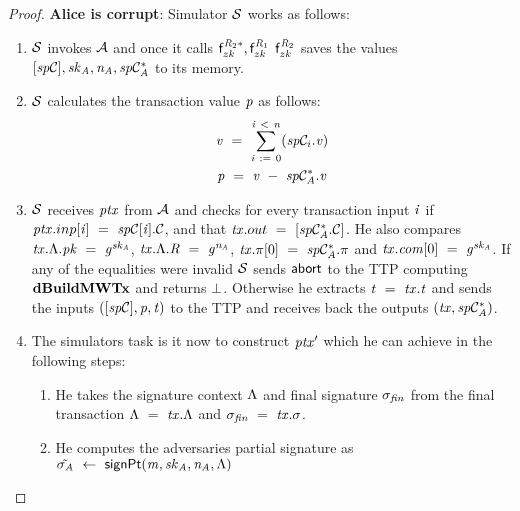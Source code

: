 \begin{proof}
    \textbf{Alice is corrupt}: Simulator $\mathcal{S}$ works as follows:
    \begin{enumerate}
        \item $\mathcal{S}$ invokes $\mathcal{A}$ and once it calls $\mathsf{f}^{\mathit{R}_2*}_{zk}, \mathsf{f}^{\mathit{R}_1}_{zk}$ $\mathsf{f}^{\mathit{R}_2}_{zk}$ saves the values $[\mathit{sp}\mathcal{C}], \mathit{sk}_{\mathit{A}}, \mathit{\mathit{n}_{\mathit{A}}}, \mathit{sp}\mathcal{C}_{\mathit{A}}^*$ to its memory.
        \item $\mathcal{S}$ calculates the transaction value $\mathit{p}$ as follows:
        \begin{gather*}
            \mathit{v} ~=~ \sum_{\mathit{i} ~:=~ 0}^{\mathit{i} ~<~ \mathit{n}}(\mathit{sp}\mathcal{C}_i.\mathit{v}) \\
            \mathit{p} ~=~ \mathit{v} ~-~ \mathit{sp}\mathcal{C}_{\mathit{A}}^*.\mathit{v}
        \end{gather*}
        \item $\mathcal{S}$ receives $\mathit{ptx}$ from $\mathcal{A}$ and checks for every transaction input $\mathit{i}$ if $\mathit{ptx}.inp[\mathit{i}] ~=~ \mathit{sp}\mathcal{C}[\mathit{i}].\mathcal{C}$, and that $\mathit{tx}.out ~=~ [\mathit{sp}\mathcal{C}_{\mathit{A}}^*.\mathcal{C}]$.
        He also compares $\mathit{tx}.\Lambda.\mathit{pk} ~=~ \mathit{g}^{\mathit{sk}_{\mathit{A}}}$, $\mathit{tx}.\Lambda.\mathit{R} ~=~ \mathit{g}^{\mathit{\mathit{n}_{\mathit{A}}}}$, $\mathit{tx}.\pi[0] ~=~ \mathit{sp}\mathcal{C}_{\mathit{A}}^*.\pi$ and $\mathit{tx}.\mathit{com}[0] ~=~ \mathit{g}^{\mathit{sk}_{\mathit{A}}}$.
        If any of the equalities were invalid $\mathcal{S}$ sends $\mathsf{abort}$ to the TTP computing $\mathbf{dBuildMWTx}$ and returns $\bot$.
        Otherwise he extracts $\mathit{t} ~=~ \mathit{tx}.\mathit{t}$ and sends the inputs $([\mathit{sp}\mathcal{C}], \mathit{p}, \mathit{t})$ to the TTP and receives back the outputs $(\mathit{tx}, \mathit{sp}\mathcal{C}_{\mathit{A}}^*)$.
        \item The simulators task is it now to construct ${\mathit{ptx}}'$ which he can achieve in the following steps:
        \begin{enumerate}
            \item He takes the signature context $\Lambda$ and final signature $\sigma_{\mathit{fin}}$ from the final transaction $\Lambda ~=~ \mathit{tx}.\Lambda$ and $\sigma_{\mathit{fin}} ~=~ \mathit{tx}.\sigma$.
            \item He computes the adversaries partial signature as $\tilde{\sigma_{\mathit{A}}} ~\leftarrow~ \mathsf{signPt}(\mathit{m}, \mathit{sk}_{\mathit{A}}, \mathit{\mathit{n}_{\mathit{A}}}, \Lambda)$

\end{enumerate}
\end{enumerate}
\end{proof}
